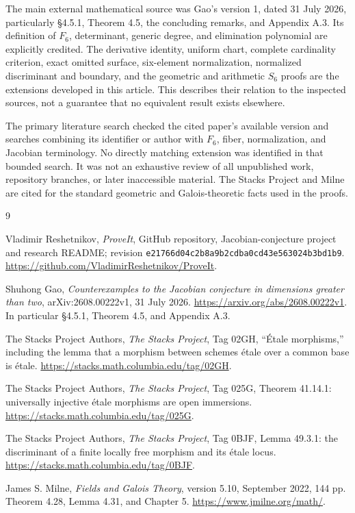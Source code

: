 \documentclass[11pt,a4paper]{article}
\theoremstyle{definition}
\newcommand{\code}[1]{\texttt{\nolinkurl{#1}}}
\begin{document}
The main external mathematical source was Gao's version 1, dated
31 July 2026, particularly \S4.5.1, Theorem 4.5, the concluding remarks,
and Appendix A.3. Its definition of $F_6$, determinant, generic degree,
and elimination polynomial are explicitly credited. The derivative
identity, uniform chart, complete cardinality criterion, exact omitted
surface, six-element normalization, normalized discriminant and boundary,
and the geometric and arithmetic $S_6$ proofs are the extensions developed
in this article. This describes their relation to the inspected sources,
not a guarantee that no equivalent result exists elsewhere.

The primary literature search checked the cited paper's available version
and searches combining its identifier or author with $F_6$, fiber,
normalization, and Jacobian terminology. No directly matching extension
was identified in that bounded search. It was not an exhaustive review
of all unpublished work, repository branches, or later inaccessible
material. The Stacks Project and Milne are cited for the standard
geometric and Galois-theoretic facts used in the proofs.

\begin{thebibliography}{9}
Vladimir Reshetnikov, \emph{ProveIt}, GitHub repository, Jacobian-conjecture
project and research README; revision
\code{e21766d04c2b8a9b2cdba0cd43e563024b3bd1b9}.
\url{https://github.com/VladimirReshetnikov/ProveIt}.

Shuhong Gao, \emph{Counterexamples to the Jacobian conjecture in dimensions
greater than two}, arXiv:2608.00222v1, 31 July 2026.
\url{https://arxiv.org/abs/2608.00222v1}.
In particular \S4.5.1, Theorem 4.5, and Appendix A.3.

The Stacks Project Authors, \emph{The Stacks Project}, Tag 02GH,
``\'Etale morphisms,'' including the lemma that a morphism between
schemes \'etale over a common base is \'etale.
\url{https://stacks.math.columbia.edu/tag/02GH}.

The Stacks Project Authors, \emph{The Stacks Project}, Tag 025G,
Theorem 41.14.1: universally injective \'etale morphisms are open immersions.
\url{https://stacks.math.columbia.edu/tag/025G}.

The Stacks Project Authors, \emph{The Stacks Project}, Tag 0BJF,
Lemma 49.3.1: the discriminant of a finite locally free morphism and
its \'etale locus.
\url{https://stacks.math.columbia.edu/tag/0BJF}.

James S. Milne, \emph{Fields and Galois Theory}, version 5.10,
September 2022, 144 pp. Theorem 4.28, Lemma 4.31, and Chapter 5.
\url{https://www.jmilne.org/math/}.
\end{thebibliography}
\end{document}
